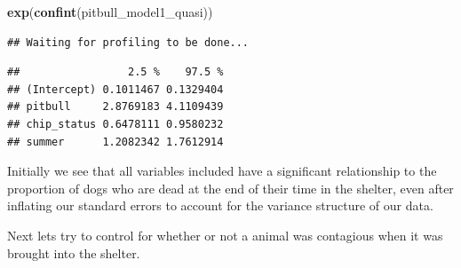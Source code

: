 \documentclass[]{article}
\newenvironment{Shaded}{\begin{snugshade}}{\end{snugshade}}
\newcommand{\KeywordTok}[1]{\textcolor[rgb]{0.13,0.29,0.53}{\textbf{#1}}}
\newcommand{\NormalTok}[1]{#1}
\begin{document}
\begin{Shaded}
\begin{Highlighting}[]
\KeywordTok{exp}\NormalTok{(}\KeywordTok{confint}\NormalTok{(pitbull_model1_quasi))}
\end{Highlighting}
\end{Shaded}

\begin{verbatim}
## Waiting for profiling to be done...
\end{verbatim}

\begin{verbatim}
##                 2.5 %    97.5 %
## (Intercept) 0.1011467 0.1329404
## pitbull     2.8769183 4.1109439
## chip_status 0.6478111 0.9580232
## summer      1.2082342 1.7612914
\end{verbatim}

Initially we see that all variables included have a significant
relationship to the proportion of dogs who are dead at the end of their
time in the shelter, even after inflating our standard errors to account
for the variance structure of our data.

Next lets try to control for whether or not a animal was contagious when
it was brought into the shelter.
\end{document}
